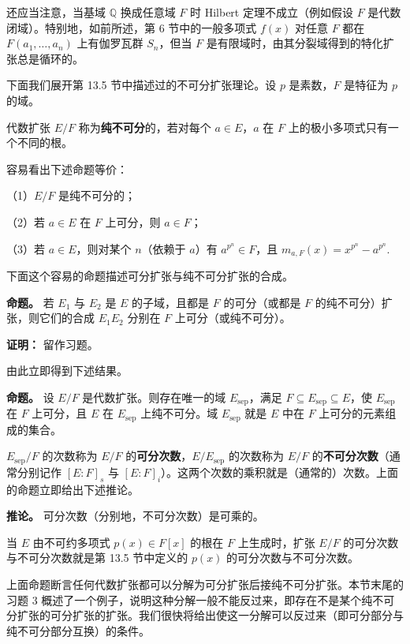 还应当注意，当基域 \(\mathbb{Q}\) 换成任意域 \(F\) 时 Hilbert 定理不成立（例如假设 \(F\) 是代数闭域）。特别地，如前所述，第 6 节中的一般多项式 \(f(x)\) 对任意 \(F\) 都在 \(F(a_1, \ldots, a_n)\) 上有伽罗瓦群 \(S_n\)，但当 \(F\) 是有限域时，由其分裂域得到的特化扩张总是循环的。

下面我们展开第 13.5 节中描述过的不可分扩张理论。设 \(p\) 是素数，\(F\) 是特征为 \(p\) 的域。

\begin{definition}
代数扩张 \(E/F\) 称为\textbf{纯不可分}的，若对每个 \(a \in E\)，\(a\) 在 \(F\) 上的极小多项式只有一个不同的根。
\end{definition}

容易看出下述命题等价：

（1）\(E/F\) 是纯不可分的；

（2）若 \(a \in E\) 在 \(F\) 上可分，则 \(a \in F\)；

（3）若 \(a \in E\)，则对某个 \(n\)（依赖于 \(a\)）有 \(a^{p^n} \in F\)，且 \(m_{a,F}(x) = x^{p^n}-a^{p^n}\).

下面这个容易的命题描述可分扩张与纯不可分扩张的合成。

\noindent\textbf{命题。} 若 \(E_1\) 与 \(E_2\) 是 \(E\) 的子域，且都是 \(F\) 的可分（或都是 \(F\) 的纯不可分）扩张，则它们的合成 \(E_1E_2\) 分别在 \(F\) 上可分（或纯不可分）。

\noindent\textbf{证明：} 留作习题。

由此立即得到下述结果。

\noindent\textbf{命题。} 设 \(E/F\) 是代数扩张。则存在唯一的域 \(E_{\mathrm{sep}}\)，满足 \(F \subseteq E_{\mathrm{sep}} \subseteq E\)，使 \(E_{\mathrm{sep}}\) 在 \(F\) 上可分，且 \(E\) 在 \(E_{\mathrm{sep}}\) 上纯不可分。域 \(E_{\mathrm{sep}}\) 就是 \(E\) 中在 \(F\) 上可分的元素组成的集合。

\(E_{\mathrm{sep}}/F\) 的次数称为 \(E/F\) 的\textbf{可分次数}，\(E/E_{\mathrm{sep}}\) 的次数称为 \(E/F\) 的\textbf{不可分次数}（通常分别记作 \([E:F]_s\) 与 \([E:F]_i\)）。这两个次数的乘积就是（通常的）次数。上面的命题立即给出下述推论。

\noindent\textbf{推论。} 可分次数（分别地，不可分次数）是可乘的。

当 \(E\) 由不可约多项式 \(p(x) \in F[x]\) 的根在 \(F\) 上生成时，扩张 \(E/F\) 的可分次数与不可分次数就是第 13.5 节中定义的 \(p(x)\) 的可分次数与不可分次数。

上面命题断言任何代数扩张都可以分解为可分扩张后接纯不可分扩张。本节末尾的习题 3 概述了一个例子，说明这种分解一般不能反过来，即存在不是某个纯不可分扩张的可分扩张的扩张。我们很快将给出使这一分解可以反过来（即可分部分与纯不可分部分互换）的条件。

